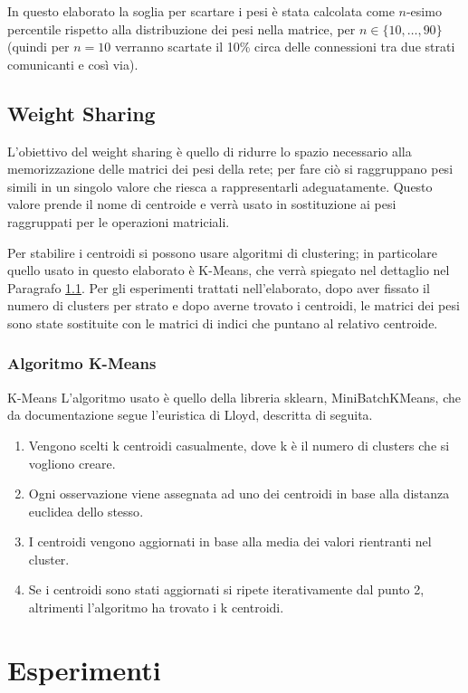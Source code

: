 \documentclass[12pt]{report}
\begin{document}
In questo elaborato la soglia per scartare i pesi è stata calcolata come $n$-esimo percentile rispetto alla distribuzione dei pesi nella matrice, per $n \in \{10, \dots, 90 \}$ (quindi per $n=10$ verranno scartate il 10\% circa delle connessioni tra due strati comunicanti e così via).

\section{Weight Sharing}

L’obiettivo del weight sharing è quello di ridurre lo spazio necessario alla memorizzazione delle matrici dei pesi della rete; per fare ciò si raggruppano pesi simili in un singolo valore che riesca a rappresentarli adeguatamente. Questo valore prende il nome di centroide e verrà usato in sostituzione ai pesi raggruppati per le operazioni matriciali. 

Per stabilire i centroidi si possono usare algoritmi di clustering; in particolare quello usato in questo elaborato è K-Means, che verrà spiegato nel dettaglio nel Paragrafo \ref{kmeans}. Per gli esperimenti trattati nell'elaborato, dopo aver fissato il numero di clusters per strato e dopo averne trovato i centroidi, le matrici dei pesi sono state sostituite con le matrici di indici che puntano al relativo centroide. 

\subsection{Algoritmo K-Means}\label{kmeans}
K-Means
L’algoritmo usato è quello della libreria sklearn, MiniBatchKMeans, che da documentazione segue l’euristica di Lloyd, descritta di seguita.

\begin{enumerate}
\item{Vengono scelti k centroidi casualmente, dove k è il numero di clusters che si vogliono creare}.
\item{Ogni osservazione viene assegnata ad uno dei centroidi in base alla distanza euclidea dello stesso}.
\item{I centroidi vengono aggiornati in base alla media dei valori rientranti nel cluster}.
\item{Se i centroidi sono stati aggiornati si ripete iterativamente dal punto 2, altrimenti l’algoritmo ha trovato i k centroidi}.
\end{enumerate}
 

\chapter{Esperimenti}
\end{document}
